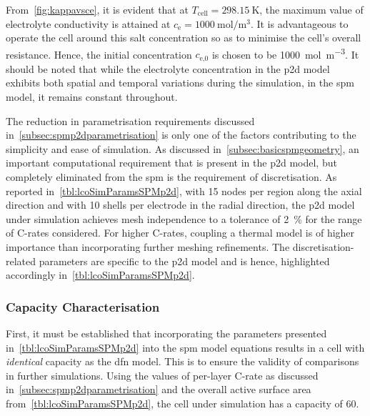 From~\cref{fig:kappavsce},       it        is       evident        that       at
$T_\text{cell}=\SI{298.15}{\kelvin}$,   the   maximum   value   of   electrolyte
conductivity is attained at  $c_\text{e} = \SI{1000}{\mole\per\meter\cubed}$. It
is advantageous  to operate  the cell  around this salt  concentration so  as to
minimise  the  cell's  overall  resistance.  Hence,  the  initial  concentration
$c_\text{e,0}$ is  chosen to  be \SI{1000}{\mole\per\meter\cubed}. It  should be
noted that while  the electrolyte concentration in the  \gls{p2d} model exhibits
both spatial  and temporal  variations during the  simulation, in  the \gls{spm}
model, it remains constant throughout.

The      reduction      in      parametrisation      requirements      discussed
in~\cref{subsec:spmp2dparametrisation}    is   only    one   of    the   factors
contributing  to   the  simplicity   and  ease   of  simulation.   As  discussed
in~\cref{subsec:basicspmgeometry},   an   important  computational   requirement
that   is  present   in   the  \gls{p2d}   model,   but  completely   eliminated
from  the   \gls{spm}  is  the   requirement  of  discretisation.   As  reported
in~\cref{tbl:lcoSimParamsSPMp2d},  with  15 nodes  per  region  along the  axial
direction  and  with 10  shells  per  electrode  in  the radial  direction,  the
\gls{p2d}  model under  simulation  achieves mesh  independence  to a  tolerance
of  \approx   \SI{2}{\percent}  for  the   range  of  C-rates   considered.  For
higher  C-rates,  coupling  a  thermal   model  is  of  higher  importance  than
incorporating further meshing refinements. The discretisation-related parameters
are  specific to  the  \gls{p2d}  model and  is  hence, highlighted  accordingly
in~\cref{tbl:lcoSimParamsSPMp2d}.

\subsubsection*{Capacity Characterisation}\label{subsubsec:capcharspmp2d}

First,  it  must be  established  that  incorporating the  parameters  presented
in~\cref{tbl:lcoSimParamsSPMp2d} into the \gls{spm} model equations results in a
cell with  \emph{identical} capacity as the  \gls{dfn} model. This is  to ensure
the  validity  of  comparisons  in  further simulations.  Using  the  values  of
per-layer  C-rate as  discussed  in~\cref{subsec:spmp2dparametrisation} and  the
overall active  surface area from~\cref{tbl:lcoSimParamsSPMp2d}, the  cell under
simulation has a capacity of \SI{60}{\amphour}.

